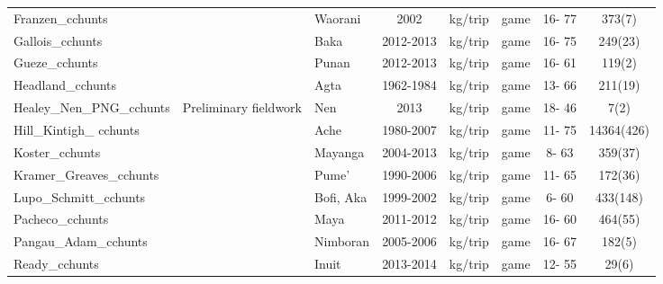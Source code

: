 \begin{landscape}
\begin{longtable}{M{2.6cm} M{3.6cm} M{1.5cm} c c M{1cm} c c}
Franzen\_cchunts               & \cite{franzen_evaluating_2006}            & Waorani         & 2002       & kg/trip   & game               & 16- 77  & 373(7)      \\
Gallois\_cchunts               & \cite{reyes-garcia_adaptive_2016}         & Baka            & 2012-2013  & kg/trip   & game               & 16- 75  & 249(23)     \\
Gueze\_cchunts                 & \cite{reyes-garcia_adaptive_2016}         & Punan           & 2012-2013  & kg/trip   & game               & 16- 61  & 119(2)      \\
Headland\_cchunts              & \cite{headland_why_1986}                  & Agta            & 1962-1984  & kg/trip   & game               & 13- 66  & 211(19)     \\
Healey\_Nen\_PNG\_cchunts        & Preliminary fieldwork                     & Nen             & 2013       & kg/trip   & game               & 18- 46  & 7(2)        \\
Hill\_Kintigh\_ cchunts          & \cite{hill_can_2009}                      & Ache            & 1980-2007  & kg/trip   & game               & 11- 75  & 14364(426)  \\
Koster\_cchunts                & \cite{koster_hunting_2008}                & Mayanga         & 2004-2013  & kg/trip   & game               & 8- 63   & 359(37)     \\
Kramer\_Greaves\_cchunts        & \cite{kramer_why_2017}                    & Pume'           & 1990-2006  & kg/trip   & game               & 11- 65  & 172(36)     \\
Lupo\_Schmitt\_cchunts          & \cite{lupo_upper_2002}                    & Bofi, Aka       & 1999-2002  & kg/trip   & game               & 6- 60   & 433(148)    \\
Pacheco\_cchunts               & \cite{pacheco-cobos_economic_2015}        & Maya            & 2011-2012  & kg/trip   & game               & 16- 60  & 464(55)     \\
Pangau\_Adam\_cchunts           & \cite{pangau-adam_wildmeat_2012}          & Nimboran        & 2005-2006  & kg/trip   & game               & 16- 67  & 182(5)      \\
Ready\_cchunts                 & \cite{ready_food_2016}                    & Inuit           & 2013-2014  & kg/trip   & game               & 12- 55  & 29(6)       \\

\end{longtable}
\end{landscape}
